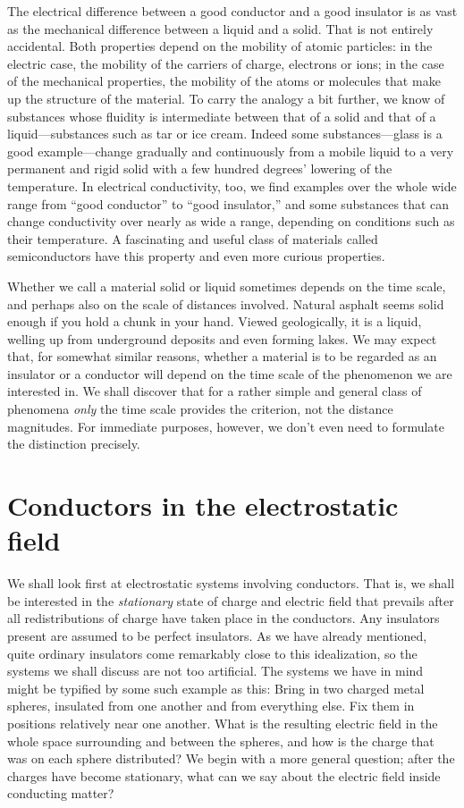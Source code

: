 The electrical difference between a good conductor and a good
insulator is as vast as the mechanical difference between a liquid and
a solid. That is not entirely accidental. Both properties depend on
the mobility of atomic particles: in the electric case, the mobility of
the carriers of charge, electrons or ions; in the case of the mechanical
properties, the mobility of the atoms or molecules that make up the
structure of the material. To carry the analogy a bit further, we
know of substances whose fluidity is intermediate between that of a
solid and that of a liquid---substances such as tar or ice cream. Indeed
some substances---glass is a good example---change gradually
and continuously from a mobile liquid to a very permanent and rigid
solid with a few hundred degrees' lowering of the temperature. In
electrical conductivity, too, we find examples over the whole wide
range from ``good conductor'' to ``good insulator,'' and some substances
that can change conductivity over nearly as wide a range,
depending on conditions such as their temperature. A fascinating
and useful class of materials called semiconductors have this property
and even more curious properties.

Whether we call a material solid or liquid sometimes depends on
the time scale, and perhaps also on the scale of distances involved.
Natural asphalt seems solid enough if you hold a chunk in your hand.
Viewed geologically, it is a liquid, welling up from underground deposits
and even forming lakes. We may expect that, for somewhat
similar reasons, whether a material is to be regarded as an insulator
or a conductor will depend on the time scale of the phenomenon we
are interested in. We shall discover that for a rather simple and
general class of phenomena \emph{only} the time scale provides the criterion,
not the distance magnitudes. For immediate purposes, however, we
don't even need to formulate the distinction precisely.

\section{Conductors in the electrostatic field}

We shall look first at electrostatic systems involving conductors.
That is, we shall be interested in the \emph{stationary} state of charge and
electric field that prevails after all redistributions of charge have
taken place in the conductors. Any insulators present are assumed
to be perfect insulators. As we have already mentioned, quite
ordinary insulators come remarkably close to this idealization, so
the systems we shall discuss are not too artificial. The systems we
have in mind might be typified by some such example as this: Bring
in two charged metal spheres, insulated from one another and from
everything else. Fix them in positions relatively near one another.
What is the resulting electric field in the whole space surrounding
and between the spheres, and how is the charge that was on each
sphere distributed? We begin with a more general question; after
the charges have become stationary, what can we say about the electric
field inside conducting matter? 


